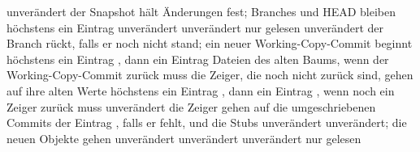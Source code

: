 {\startplacetable[title={Was die Schritte nach einem Abbruch ändern},reference=tab:recovery,
    location=here]
\startxtable[frame=off,option=stretch,align={flushleft,high}]
\startxrow[topframe=on,bottomframe=on]
 \stopxcell
{} \stopxcell
{} \stopxcell
{} \stopxcell
\stopxrow
\startxrow
\startxcell {} \stopxcell
\startxcell unverändert \stopxcell
\startxcell der Snapshot hält Änderungen fest; Branches und HEAD bleiben \stopxcell
\startxcell höchstens ein Eintrag  \stopxcell
\stopxrow
\startxrow
\startxcell {} \stopxcell
\startxcell unverändert \stopxcell
\startxcell unverändert \stopxcell
\startxcell nur gelesen \stopxcell
\stopxrow
\startxrow
\startxcell {} \stopxcell
\startxcell unverändert \stopxcell
\startxcell der Branch rückt, falls er noch nicht stand;
ein neuer Working-Copy-Commit beginnt \stopxcell
\startxcell höchstens ein Eintrag , dann ein Eintrag  \stopxcell
\stopxrow
\startxrow
\startxcell {} \stopxcell
\startxcell Dateien des alten Baums, wenn der Working-Copy-Commit zurück muss \stopxcell
\startxcell die Zeiger, die noch nicht zurück sind, gehen auf ihre alten Werte \stopxcell
\startxcell höchstens ein Eintrag , dann ein Eintrag ,
wenn noch ein Zeiger zurück muss \stopxcell
\stopxrow
\startxrow
\startxcell {} \stopxcell
\startxcell unverändert \stopxcell
\startxcell die Zeiger gehen auf die umgeschriebenen Commits \stopxcell
\startxcell der Eintrag , falls er fehlt, und die Stubs \stopxcell
\stopxrow
\startxrow
\startxcell {} \stopxcell
\startxcell unverändert \stopxcell
\startxcell unverändert; die neuen Objekte gehen \stopxcell
\startxcell unverändert \stopxcell
\stopxrow
\startxrow[bottomframe=on]
\startxcell {} \stopxcell
\startxcell unverändert \stopxcell
\startxcell unverändert \stopxcell
\startxcell nur gelesen \stopxcell
\stopxrow
\stopxtable
\stopplacetable

}
